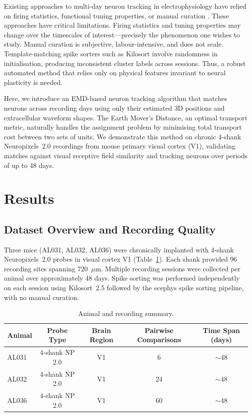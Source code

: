 \documentclass[11pt]{article}
\begin{document}
Existing approaches to multi-day neuron tracking in electrophysiology have relied on firing statistics, functional tuning properties, or manual curation \citep{tolias2007recording, fraser2012control, dhawale2017automated}. These approaches have critical limitations. Firing statistics and tuning properties may change over the timescales of interest---precisely the phenomenon one wishes to study. Manual curation is subjective, labour-intensive, and does not scale. Template-matching spike sorters such as Kilosort \citep{pachitariu2016kilosort} involve randomness in initialisation, producing inconsistent cluster labels across sessions. Thus, a robust automated method that relies only on physical features invariant to neural plasticity is needed.

Here, we introduce an EMD-based neuron tracking algorithm \citep{rubner2000earth} that matches neurons across recording days using only their estimated 3D positions and extracellular waveform shapes. The Earth Mover's Distance, an optimal transport metric, naturally handles the assignment problem by minimising total transport cost between two sets of units. We demonstrate this method on chronic 4-shank Neuropixels~2.0 recordings from mouse primary visual cortex (V1), validating matches against visual receptive field similarity and tracking neurons over periods of up to 48 days.

\section{Results}

\subsection{Dataset Overview and Recording Quality}

Three mice (AL031, AL032, AL036) were chronically implanted with 4-shank Neuropixels~2.0 probes in visual cortex V1 (Table~\ref{tab:animals}). Each shank provided 96 recording sites spanning 720~$\mu$m. Multiple recording sessions were collected per animal over approximately 48 days. Spike sorting was performed independently on each session using Kilosort~2.5 followed by the ecephys spike sorting pipeline, with no manual curation.

\begin{table}[H]
\centering
\caption{Animal and recording summary.}
\label{tab:animals}
\begin{tabular}{@{}lcccc@{}}
\toprule
Animal & Probe Type & Brain Region & Pairwise Comparisons & Time Span (days) \\
\midrule
AL031 & 4-shank NP 2.0 & V1 & 6 & $\sim$48 \\
AL032 & 4-shank NP 2.0 & V1 & 24 & $\sim$48 \\
AL036 & 4-shank NP 2.0 & V1 & 60 & $\sim$48 \\
\bottomrule
\end{tabular}
\end{table}
\end{document}
